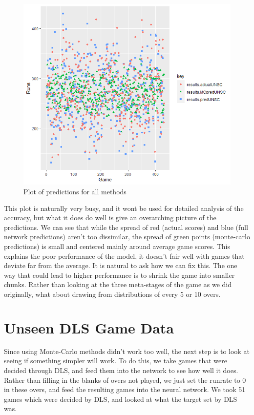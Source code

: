 \begin{figure}[h]
    \label{fullPredDist}
    \centering
    \caption{Plot of predictions for all methods}
    \includegraphics[scale=0.6]{figures/fullPredDist.png}
\end{figure}

This plot is naturally very busy, and it wont be used for detailed analysis of the accuracy, but what it does do well is give an overarching picture of the predictions. 
We can see that while the spread of red (actual scores) and blue (full network predictions) aren't too dissimilar, the spread of green points (monte-carlo predictions) is small and centered mainly 
around average game scores. This explains the poor performance of the model, it doesn't fair well with games that deviate far from the average. It is natural to ask how we can fix this. The one way that 
could lead to higher performance is to shrink the game into smaller chunks. Rather than looking at the three meta-stages of the game as we did originally, what about drawing from distributions of every 5 or 10 overs.

\section{Unseen DLS Game Data}
Since using Monte-Carlo methods didn't work too well, the next step is to look at seeing if something simpler will work. To do this, we take games that were decided through DLS, and 
feed them into the network to see how well it does. Rather than filling in the blanks of overs not played, we just set the runrate to 0 in these overs, and feed the resulting games into the neural network. 
We took 51 games which were decided by DLS, and looked at what the target set by DLS was. 


